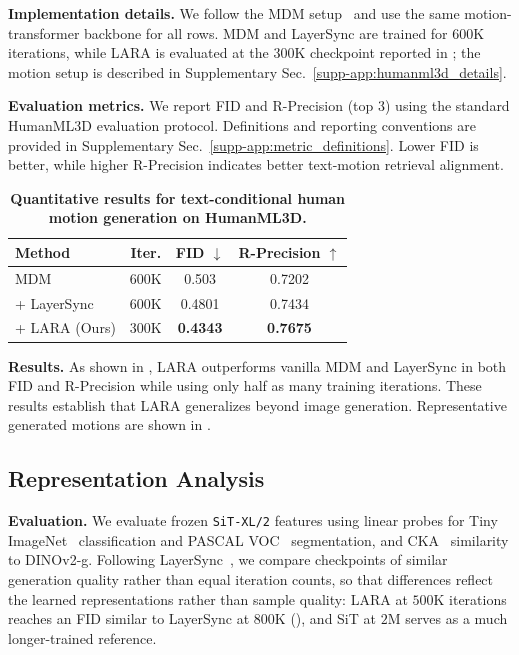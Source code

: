 \noindent\textbf{Implementation details.}
We follow the MDM setup~\citep{tevet2022mdm} and use the same motion-transformer backbone for all rows. MDM and LayerSync are trained for $600\mathrm{K}$ iterations, while LARA is evaluated at the $300\mathrm{K}$ checkpoint reported in ; the motion setup is described in Supplementary Sec.~\ref{supp-app:humanml3d_details}.

\noindent\textbf{Evaluation metrics.}
We report FID and R-Precision (top 3) using the standard HumanML3D evaluation protocol. Definitions and reporting conventions are provided in Supplementary Sec.~\ref{supp-app:metric_definitions}. Lower FID is better, while higher R-Precision indicates better text-motion retrieval alignment.

\begin{table}[!htbp]
    \centering
    \caption{\textbf{Quantitative results for text-conditional human motion generation on HumanML3D.}}
    \label{tab:humanml3d_results}
    \small
    \setlength{\tabcolsep}{8pt}
    \renewcommand{\arraystretch}{0.9}
    \begin{tabular}{@{}lccc@{}}
        \toprule
        Method & Iter. & FID $\downarrow$ & R-Precision $\uparrow$ \\
        \midrule
        MDM & 600K & 0.503 & 0.7202 \\
        + LayerSync & 600K & 0.4801 & 0.7434 \\
        + LARA (Ours) & 300K & \textbf{0.4343} & \textbf{0.7675} \\
        \bottomrule
    \end{tabular}
\end{table}

\noindent\textbf{Results.}
As shown in , LARA outperforms vanilla MDM and LayerSync in both FID and R-Precision while using only half as many training iterations. These results establish that LARA generalizes beyond image generation. Representative generated motions are shown in .


\subsection{Representation Analysis}
\label{sec:representation_analysis}

\noindent\textbf{Evaluation.}
We evaluate frozen \texttt{SiT-XL/2} features using linear probes for Tiny ImageNet~\citep{le2015tiny} classification and PASCAL VOC~\citep{everingham2010pascal} segmentation, and CKA~\citep{kornblith2019similarity} similarity to DINOv2-g. Following LayerSync~\citep{haghighi2026layersync}, we compare checkpoints of similar generation quality rather than equal iteration counts, so that differences reflect the learned representations rather than sample quality: LARA at $500\mathrm{K}$ iterations reaches an FID similar to LayerSync at $800\mathrm{K}$ (), and SiT at $2\mathrm{M}$ serves as a much longer-trained reference.


